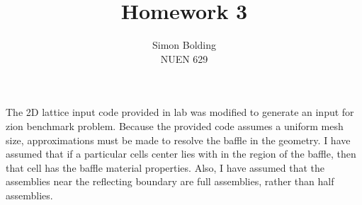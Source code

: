 \documentclass[12pt]{article}
\newenvironment{solnum}[2][Solution]{\begin{trivlist}
\item[\hskip \labelsep {\bfseries #1}\hskip \labelsep {\bfseries #2:}]\hspace{0.3in}\newline\newline}{\end{trivlist}}
\begin{document}
 
 
\title{Homework 3}%
\author{Simon Bolding\\ %
NUEN 629} %
 
\maketitle

\clearpage



\begin{solnum}{1-1}
    
The 2D lattice input code provided in lab was modified to generate an input for zion
benchmark problem.  Because the
provided code assumes a uniform mesh size, approximations must be made to resolve the
baffle in the geometry.  I have assumed that if a particular cells center lies with
in the region of the baffle, then that cell has the baffle material properties.  Also, I have assumed that the assemblies near the reflecting
boundary are full assemblies, rather than half assemblies.

\end{solnum}
\end{document}
